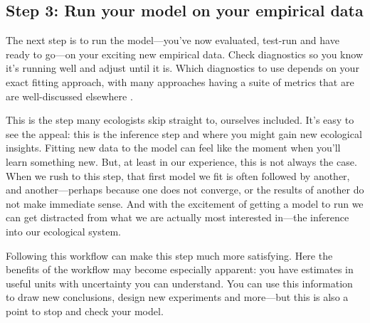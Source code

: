 \documentclass[11pt]{article}
\newcommand{\R}[1]{\label{}\linelabel{#1}}
\begin{document}
 \subsection*{Step 3: Run your model on your empirical data} 
 
The next step is to run the model---you've now evaluated, test-run and have ready to go---on your exciting new empirical data. Check diagnostics so you know it's running well and adjust until it is. \R{beyondMCMC5start}Which diagnostics to use depends on your exact fitting approach, with many approaches having a suite of metrics that are are well-discussed elsewhere \citep[for Bayesian methods, this includes a suite of convergence and efficiency metrics][]{betanworkflow,gelman2020bayesian,vandeschoot2021,gabryvis}. \R{beyondMCMC5end}%
 
This is the step many ecologists skip straight to, ourselves included. It's easy to see the appeal: this is the inference step and where you might gain new ecological insights. Fitting new data to the model can feel like the moment when you'll learn something new. But, at least in our experience, this is not always the case. When we rush to this step, that first model we fit is often followed by another, and another---perhaps because one does not converge, or the results of another do not make immediate sense. And with the excitement of getting a model to run we can get distracted from what we are actually most interested in---the inference into our ecological system. %

Following this workflow can make this step much more satisfying. Here the benefits of the workflow may become especially apparent: you have estimates in useful units with uncertainty you can understand. You can use this information to draw new conclusions, design new experiments and more---but this is also a point to stop and check your model. 
\end{document}
